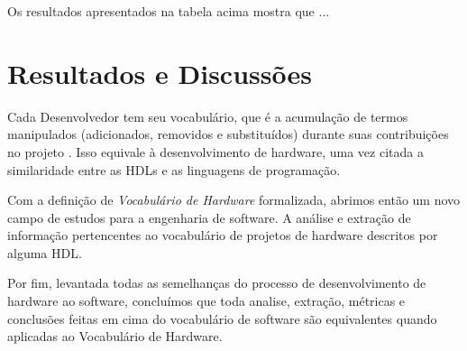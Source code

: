 \documentclass[12pt, twocolumn, a4paper]{article}
\begin{document}
	
Os resultados apresentados na tabela acima mostra que ...
	
	
	\section{Resultados e Discussões}
  
Cada Desenvolvedor tem seu vocabulário, que é a acumulação de termos manipulados (adicionados, removidos e substituídos) durante suas contribuições no projeto \cite{Santos2015}. Isso equivale à desenvolvimento de hardware, uma vez citada a similaridade entre as HDLs e as linguagens de programação.

Com a definição de \textit{Vocabulário de Hardware} formalizada, abrimos então um novo campo de estudos para a engenharia de software. A análise e extração de informação pertencentes ao vocabulário de projetos de hardware descritos por alguma HDL.

Por fim, levantada todas as semelhanças do processo de desenvolvimento de hardware ao software, concluímos que toda analise, extração, métricas e conclusões feitas em cima do vocabulário de software são equivalentes quando aplicadas ao Vocabulário de Hardware.
	
	
	
\end{document}
